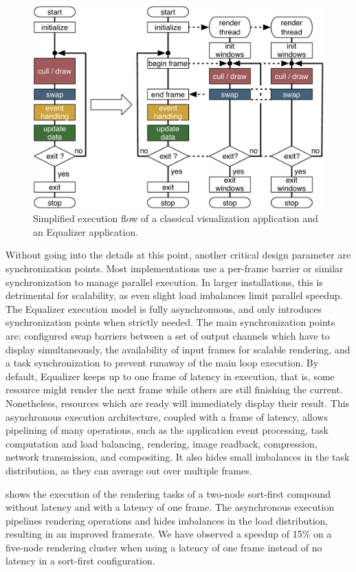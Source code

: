 \begin{figure}[ht]\center
 \includegraphics[width=.9\columnwidth]{images/executionFlow}
 \caption{Simplified execution flow of a classical visualization application
  and an Equalizer application.}
 \label{FIG_execution}
\end{figure}

Without going into the details at this point, another critical design parameter
are synchronization points. Most implementations use a per-frame barrier or
similar synchronization to manage parallel execution. In larger installations,
this is detrimental for scalability, as even slight load imbalances limit
parallel speedup. The Equalizer execution model is fully asynchronuous, and
only introduces synchronization points when strictly needed. The main
synchronization points are: configured swap barriers between a set of output
channels which have to display simultaneously, the availability of input frames
for scalable rendering, and a task synchronization to prevent runaway of the
main loop execution. By default, Equalizer keeps up to one frame of latency in
execution, that is, some resource might render the next frame while others are
still finishing the current. Nonetheless, resources which are ready will
immediately display their result. This asynchronous execution architecture,
coupled with a frame of latency, allows pipelining of many operations, such as
the application event processing, task computation and load balancing,
rendering, image readback, compression, network transmission, and compositing.
It also hides small imbalances in the task distribution, as they can average
out over multiple frames.

 shows the execution of the rendering tasks of a two-node
sort-first compound without latency and with a latency of one frame. The
asynchronous execution pipelines rendering operations and hides imbalances in
the load distribution, resulting in an improved framerate. We have observed a
speedup of 15\% on a five-node rendering cluster when using a latency of one
frame instead of no latency in a sort-first configuration.


